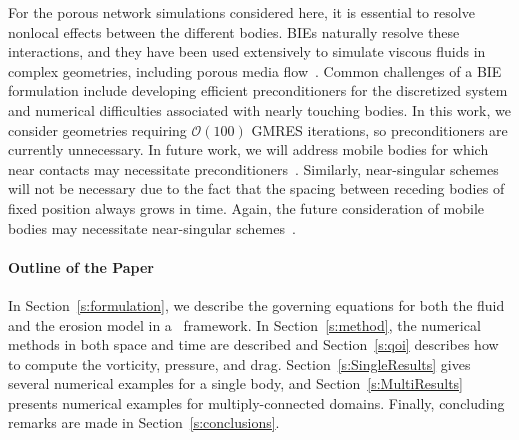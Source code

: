 \documentclass[preprint, 10pt]{elsarticle}
\begin{document}
For the porous network simulations considered here, it is essential to
resolve nonlocal effects between the different bodies.  BIEs naturally
resolve these interactions, and they have been used extensively to
simulate viscous fluids in complex geometries, including porous media
flow~\cite{dea-qua-bir-jua2018, bar-mar-vee-zha2018}.  Common challenges
of a BIE formulation include developing efficient preconditioners for
the discretized system and numerical difficulties associated with nearly
touching bodies. In this work, we consider geometries requiring
$\mathcal{O}(100)$ GMRES iterations, so preconditioners are currently
unnecessary. In future work, we will address mobile bodies for which
near contacts may necessitate preconditioners~\cite{qua-bir2015a, qua-cou-dar2018, cou-pou-dar2017}. Similarly, near-singular schemes will not be necessary due to the fact that the spacing between receding bodies of fixed position always grows in time. Again, the future consideration of mobile bodies may necessitate near-singular schemes~\cite{qua-bir2014a, klo-bar-gre-one2013, bar-wu-vee2015, hel-oja2008a, bea-lai2001}.

\paragraph{Outline of the Paper}
In Section~\ref{s:formulation}, we describe the governing equations for both the fluid and the erosion model in a \thL~framework.  In Section~\ref{s:method}, the numerical methods in both space and time are described and Section~\ref{s:qoi} describes how to compute the vorticity, pressure, and drag.  Section~\ref{s:SingleResults} gives several numerical examples for a single body, and Section~\ref{s:MultiResults} presents numerical examples for multiply-connected domains.  Finally, concluding remarks are made in Section~\ref{s:conclusions}.

\end{document}
